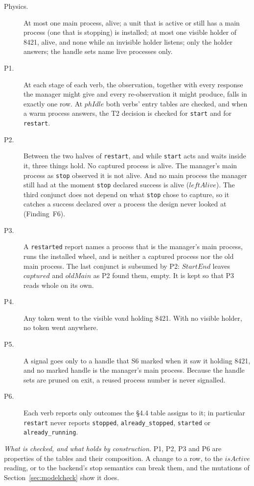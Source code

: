 \documentclass[a4paper,10pt,fleqn]{article}
\begin{document}
\begin{description}
  \item[Physics.] At most one main process, alive; a unit that is active or
    still has a main process (one that is stopping) is installed; at most
    one visible holder of 8421, alive, and none while an invisible holder
    listens; only the holder answers; the handle sets name live processes
    only.
  \item[P1.] At each stage of each verb, the observation, together with every
    response the manager might give and every re-observation it might
    produce, falls in exactly one row. At $phIdle$ both verbs' entry tables
    are checked, and when a warm process answers, the T2 decision is checked
    for \texttt{start} and for \texttt{restart}.
  \item[P2.] Between the two halves of \texttt{restart}, and while
    \texttt{start} acts and waits inside it, three things hold. No captured
    process is alive. The manager's main process as \texttt{stop} observed
    it is not alive. And no main process the manager still had at the
    moment \texttt{stop} declared success is alive ($leftAlive$). The third
    conjunct does not depend on what \texttt{stop} chose to capture, so it
    catches a success declared over a process the design never looked at
    (Finding~F6).
  \item[P3.] A \texttt{restarted} report names a process that is the
    manager's main process, runs the installed wheel, and is neither a
    captured process nor the old main process. The last conjunct is
    subsumed by P2: $StartEnd$ leaves $captured$ and $oldMain$ as P2 found
    them, empty. It is kept so that P3 reads whole on its own.
  \item[P4.] Any token went to the visible voxd holding 8421. With no visible
    holder, no token went anywhere.
  \item[P5.] A signal goes only to a handle that S6 marked when it saw it
    holding 8421, and no marked handle is the manager's main process.
    Because the handle sets are pruned on exit, a reused process number is
    never signalled.
  \item[P6.] Each verb reports only outcomes the \S4.4 table assigns to it;
    in particular \texttt{restart} never reports \texttt{stopped},
    \texttt{already\_stopped}, \texttt{started} or \texttt{already\_running}.
\end{description}

\emph{What is checked, and what holds by construction.}
P1, P2, P3 and P6 are properties of the tables and their composition. A
change to a row, to the $isActive$ reading, or to the backend's stop
semantics can break them, and the mutations of
Section~\ref{sec:modelcheck} show it does.
\end{document}
